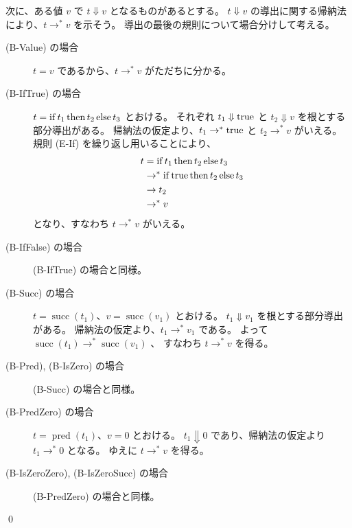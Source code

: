 \begin{jproof}
  次に、ある値 $v$ で $t \Downarrow v$ となるものがあるとする。
  $t \Downarrow v$ の導出に関する帰納法により、$t \to^* v$ を示そう。
  導出の最後の規則について場合分けして考える。
  \begin{description}
    \item[(B-Value) の場合]
      $t = v$ であるから、$t \to^* v$ がただちに分かる。
    \item[(B-IfTrue) の場合]
      $t = \operatorname{if} t_1 \operatorname{then} t_2 \operatorname{else} t_3$ とおける。
      それぞれ $t_1 \Downarrow \operatorname{true}$ と $t_2 \Downarrow v$ を根とする部分導出がある。
      帰納法の仮定より、$t_1 \to^* \operatorname{true}$ と $t_2 \to^* v$ がいえる。
      規則 (E-If) を繰り返し用いることにより、
      \begin{align*}
        t
        & = \operatorname{if} t_1 \operatorname{then} t_2 \operatorname{else} t_3
        \\ & \to^* \operatorname{if} \operatorname{true} \operatorname{then} t_2 \operatorname{else} t_3
        \\ & \to t_2
        \\ & \to^* v
      \end{align*}
      となり、すなわち $t \to^* v$ がいえる。
    \item[(B-IfFalse) の場合]
      (B-IfTrue) の場合と同様。
    \item[(B-Succ) の場合]
      $t = \operatorname{succ}(t_1)$、$v = \operatorname{succ}(v_1)$ とおける。
      $t_1 \Downarrow v_1$ を根とする部分導出がある。
      帰納法の仮定より、$t_1 \to^* v_1$ である。
      よって $\operatorname{succ}(t_1) \to^* \operatorname{succ}(v_1)$ 、
      すなわち $t \to^* v$ を得る。
    \item[(B-Pred), (B-IsZero) の場合]
      (B-Succ) の場合と同様。
    \item[(B-PredZero) の場合]
      $t = \operatorname{pred}(t_1)$、$v = 0$ とおける。
      $t_1 \Downarrow 0$ であり、帰納法の仮定より $t_1 \to^* 0$ となる。
      ゆえに $t \to^* v$ を得る。
    \item[(B-IsZeroZero), (B-IsZeroSucc) の場合]
      (B-PredZero) の場合と同様。
  \end{description}
  \qed
\end{jproof}
